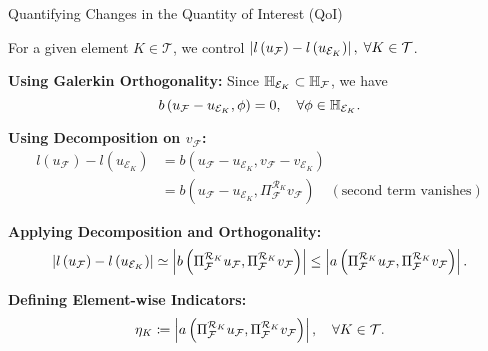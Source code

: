 \begin{frame}{Quantifying Changes in the Quantity of Interest (QoI)}

For a given element $K \in \mathcal{T}$, we control $\left|l\left(u_{\mathcal{F}}\right)-l\left(u_{\mathcal{E}_K}\right)\right|, \; \forall K \in \mathcal{T}$. 

\textbf{Using Galerkin Orthogonality:}
Since $\mathbb{H}_{\mathcal{E}_K} \subset \mathbb{H}_{\mathcal{F}}$, we have
\begin{equation}
  b\left(u_{\mathcal{F}}-u_{\mathcal{E}_K}, \phi\right)=0, \quad \forall \phi \in \mathbb{H}_{\mathcal{E}_K}.
\end{equation}

\textbf{Using Decomposition on \( v_\mathcal{F} \):}
\begin{align}
  l\left(u_{\mathcal{F}}\right)-l\left(u_{\mathcal{E}_K}\right) & = b\left(u_{\mathcal{F}}-u_{\mathcal{E}_K},v_{\mathcal{F}}-v_{\mathcal{E}_K}\right) \\
  & = b\left(u_{\mathcal{F}}-u_{\mathcal{E}_K},\Pi_{\mathcal{F}}^{\mathcal{R}_K} v_{\mathcal{F}}\right) \quad (\text{second term vanishes})
\end{align}

\textbf{Applying Decomposition and Orthogonality:}
\begin{equation}
  \left|l\left(u_{\mathcal{F}}\right)-l\left(u_{\mathcal{E}_K}\right)\right| \simeq \left|b\left(\Pi_{\mathcal{F}}^{\mathcal{R}_K} u_{\mathcal{F}},\Pi_{\mathcal{F}}^{\mathcal{R}_K} v_{\mathcal{F}}\right)\right|
  \leq  \left|a\left(\Pi_{\mathcal{F}}^{\mathcal{R}_K} u_{\mathcal{F}},\Pi_{\mathcal{F}}^{\mathcal{R}_K} v_{\mathcal{F}}\right)\right|.
\end{equation}

\textbf{Defining Element-wise Indicators:}
\begin{equation}
  \eta_K \coloneqq \left|a\left(\Pi_{\mathcal{F}}^{\mathcal{R}_K} u_{\mathcal{F}},\Pi_{\mathcal{F}}^{\mathcal{R}_K} v_{\mathcal{F}}\right)\right|, \quad \forall K \in \mathcal{T}.
\end{equation}

\end{frame}

